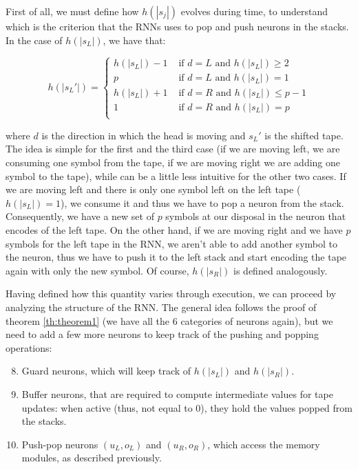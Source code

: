 \documentclass{article}
\begin{document}
First of all, we must define how $h(|s_j|)$ evolves during time, to understand which is the criterion that the RNNs uses to pop and push neurons in the stacks. In the case of $h(|s_L|)$, we have that:

\begin{equation}
    h(|s_L'|)=
    \begin{cases}
        h(|s_L|)-1 & \textrm{ if } d = L \textrm{ and } h(|s_L|) \geq 2\\
        p & \textrm{ if } d = L \textrm{ and } h(|s_L|) = 1\\
        h(|s_L|)+1 & \textrm{ if } d = R \textrm{ and } h(|s_L|) \leq p-1\\
        1 & \textrm{ if } d = R \textrm{ and } h(|s_L|) = p\\
    \end{cases}
\end{equation}

where $d$ is the direction in which the head is moving and $s_L'$ is the shifted tape. The idea is simple for the first and the third case (if we are moving left, we are consuming one symbol from the tape, if we are moving right we are adding one symbol to the tape), while can be a little less intuitive for the other two cases. If we are moving left and there is only one symbol left on the left tape ($h(|s_L|)=1$), we consume it and thus we have to pop a neuron from the stack. Consequently, we have a new set of $p$ symbols at our disposal in the neuron that encodes of the left tape. On the other hand, if we are moving right and we have $p$ symbols for the left tape in the RNN, we aren't able to add another symbol to the neuron, thus we have to push it to the left stack and start encoding the tape again with only the new symbol. Of course, $h(|s_R|)$ is defined analogously.

Having defined how this quantity varies through execution, we can proceed by analyzing the structure of the RNN. The general idea follows the proof of theorem \ref{th:theorem1} (we have all the 6 categories of neurons again), but we need to add a few more neurons to keep track of the pushing and popping operations:

\begin{enumerate}
    \setcounter{enumi}{7}
    \item Guard neurons, which will keep track of $h(|s_L|)$ and $h(|s_R|)$.
    \item Buffer neurons, that are required to compute intermediate values for tape updates: when active (thus, not equal to $0$), they hold the values popped from the stacks.
    \item Push-pop neurons $(u_L,o_L)$ and $(u_R,o_R)$, which access the memory modules, as described previously.
\end{enumerate}
\end{document}
